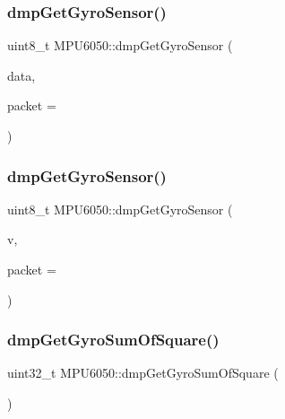 \mbox{\label{classMPU6050_a1c79849a8c39eb918945e98aea1dd878}} 
\subsubsection{\texorpdfstring{dmpGetGyroSensor()}{dmpGetGyroSensor()}\hspace{0.1cm}{\footnotesize\ttfamily [2/3]}}
{\footnotesize\ttfamily uint8\+\_\+t M\+P\+U6050\+::dmp\+Get\+Gyro\+Sensor (\begin{DoxyParamCaption}\item[{int16\+\_\+t $\ast$}]{data,  }\item[{const uint8\+\_\+t $\ast$}]{packet = {} }\end{DoxyParamCaption})}

\mbox{\label{classMPU6050_ad77de2fac9ea2b9c5e94aa245670fe48}} 
\subsubsection{\texorpdfstring{dmpGetGyroSensor()}{dmpGetGyroSensor()}\hspace{0.1cm}{\footnotesize\ttfamily [3/3]}}
{\footnotesize\ttfamily uint8\+\_\+t M\+P\+U6050\+::dmp\+Get\+Gyro\+Sensor (\begin{DoxyParamCaption}\item[{\mbox{\hyperlink{classVectorInt16}{Vector\+Int16}} $\ast$}]{v,  }\item[{const uint8\+\_\+t $\ast$}]{packet = {} }\end{DoxyParamCaption})}

\mbox{\label{classMPU6050_a0df6f1422e81759cc8fc90afe2c7c19d}} 
\subsubsection{\texorpdfstring{dmpGetGyroSumOfSquare()}{dmpGetGyroSumOfSquare()}}
{\footnotesize\ttfamily uint32\+\_\+t M\+P\+U6050\+::dmp\+Get\+Gyro\+Sum\+Of\+Square (\begin{DoxyParamCaption}{ }\end{DoxyParamCaption})}

